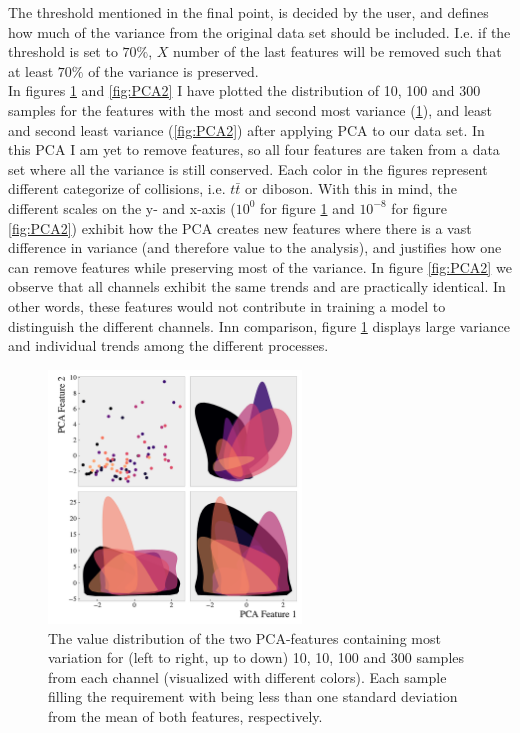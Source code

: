 The threshold mentioned in the final point, is decided by the user, and defines how much of the variance from the original data 
set should be included. I.e. if the threshold is set to $70\%$, $X$ number of the last features will be removed such 
that at least $70\%$ of the variance is preserved.
\\
In figures \ref{fig:PCA1} and \ref{fig:PCA2} I have plotted the distribution of 10, 100 and 300 samples 
for the features with the most and second most variance (\ref{fig:PCA1}), and least and second least 
variance (\ref{fig:PCA2}) after applying \ac{PCA} to our data set. In this \ac{PCA} I am yet to remove features, 
so all four features are taken from a data set where all the variance is still conserved. Each color in the figures 
represent different categorize of collisions, i.e. $t\bar{t}$ or diboson. With this in 
mind, the different scales on the y- and x-axis ($10^0$ for figure \ref{fig:PCA1} and $10^{-8}$ for figure 
\ref{fig:PCA2}) exhibit how the \ac{PCA} creates new features where there is a vast difference in variance 
(and therefore value to the analysis), and justifies how one can remove features while preserving most of the variance. 
In figure \ref{fig:PCA2} we observe that all channels exhibit the same trends and are practically identical. 
In other words, these features would not contribute in training a model to distinguish the different channels. 
Inn comparison, figure \ref{fig:PCA1} displays large variance and individual trends among the different processes.
\begin{figure}
    \centering
    \includegraphics[width=0.6\textwidth]{Figures/MLResults/DataHandling/PCA/PCAPlotFirst.pdf}
    \caption[The value distribution of the two leading \acs{PCA}-features.]{The value distribution of 
    the two \ac{PCA}-features containing most variation for (left to right, up to down) 10, 10, 100 and 
    300 samples from each channel (visualized with different colors). Each sample filling the requirement with being less than one standard 
    deviation from the mean of both features, respectively.}
    \label{fig:PCA1}
\end{figure}
